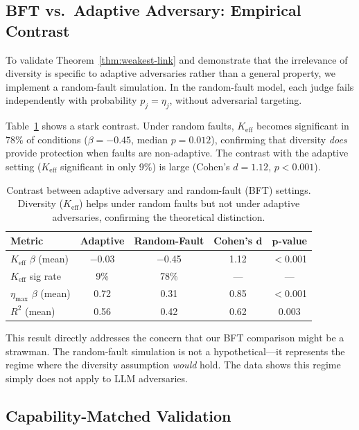 \documentclass[11pt]{article}
\begin{document}
\subsection{BFT vs.\ Adaptive Adversary: Empirical Contrast}
\label{sec:bft-contrast}

To validate Theorem~\ref{thm:weakest-link} and demonstrate that the irrelevance of diversity is specific to adaptive adversaries rather than a general property, we implement a random-fault simulation. In the random-fault model, each judge fails independently with probability $p_j = \eta_j$, without adversarial targeting.

Table~\ref{tab:bft} shows a stark contrast. Under random faults, $K_{\text{eff}}$ becomes significant in 78\% of conditions ($\beta = -0.45$, median $p = 0.012$), confirming that diversity \emph{does} provide protection when faults are non-adaptive. The contrast with the adaptive setting ($K_{\text{eff}}$ significant in only 9\%) is large (Cohen's $d = 1.12$, $p < 0.001$).

\begin{table}[t]
\centering
\caption{Contrast between adaptive adversary and random-fault (BFT) settings. Diversity ($K_{\text{eff}}$) helps under random faults but not under adaptive adversaries, confirming the theoretical distinction.}
\label{tab:bft}
\small
\begin{tabular}{lcccc}
\toprule
\textbf{Metric} & \textbf{Adaptive} & \textbf{Random-Fault} & \textbf{Cohen's} $\boldsymbol{d}$ & $\boldsymbol{p}$\textbf{-value} \\
\midrule
$K_{\text{eff}}$ $\beta$ (mean)  & $-$0.03 & $-$0.45 & 1.12 & $<$0.001 \\
$K_{\text{eff}}$ sig rate        & 9\%     & 78\%    & ---  & ---      \\
$\eta_{\max}$ $\beta$ (mean)     & 0.72    & 0.31    & 0.85 & $<$0.001 \\
$R^2$ (mean)                     & 0.56    & 0.42    & 0.62 & 0.003    \\
\bottomrule
\end{tabular}
\end{table}

This result directly addresses the concern that our BFT comparison might be a strawman. The random-fault simulation is not a hypothetical---it represents the regime where the diversity assumption \emph{would} hold. The data shows this regime simply does not apply to LLM adversaries.

\subsection{Capability-Matched Validation}
\label{sec:capability-matched}
\end{document}
